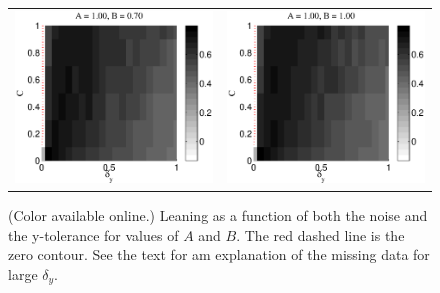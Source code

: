 \documentclass[a4paper,11pt,twocolumn]{article}
\begin{document}
\begin{figure}[ht]
\begin{tabular}{cc}
\includegraphics[scale=0.30]{NonlinearCyclicexample_Bdy_A100B70.eps} &
\includegraphics[scale=0.30]{NonlinearCyclicexample_Bdy_A100B100.eps} \\
\end{tabular}
\caption{(Color available online.) Leaning as a function of both the noise and the y-tolerance for values of $A$ and $B$.  The red dashed line is the zero contour.  See the text for am explanation of the missing data for large $\delta_y$.}
\end{figure}
\end{document}
